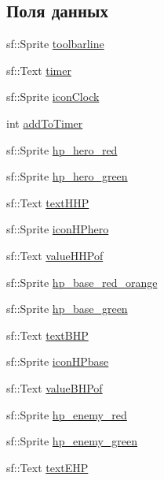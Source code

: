 \subsection*{Поля данных}
\begin{DoxyCompactItemize}
\item 
sf\+::\+Sprite \hyperlink{classToolBar_a32ef55bee6542ce2f9856b1252a5bc00}{toolbarline}
\item 
sf\+::\+Text \hyperlink{classToolBar_a5e34d6e961f9f8d200f11d5c90d10121}{timer}
\item 
sf\+::\+Sprite \hyperlink{classToolBar_a282b572766a7fb833266997f6776aa76}{icon\+Clock}
\item 
int \hyperlink{classToolBar_aa4978a990d85761cb5ab6d60ab5b081c}{add\+To\+Timer}
\item 
sf\+::\+Sprite \hyperlink{classToolBar_a188e889517db774fa50f3babdcc61054}{hp\+\_\+hero\+\_\+red}
\item 
sf\+::\+Sprite \hyperlink{classToolBar_a65b3cfcbb54e656f98639620717bc701}{hp\+\_\+hero\+\_\+green}
\item 
sf\+::\+Text \hyperlink{classToolBar_abb14f5c369cee727893e9eae44594e26}{text\+H\+HP}
\item 
sf\+::\+Sprite \hyperlink{classToolBar_a3a23db17ec632acd38594ba68d5d0584}{icon\+H\+Phero}
\item 
sf\+::\+Text \hyperlink{classToolBar_a30d2ccc2f04f7143b8df59947578b97d}{value\+H\+H\+Pof}
\item 
sf\+::\+Sprite \hyperlink{classToolBar_afb75ac14df5e61b9c50c93beda809415}{hp\+\_\+base\+\_\+red\+\_\+orange}
\item 
sf\+::\+Sprite \hyperlink{classToolBar_a72b41dd993c27b3cb5de4e8d3e7b1c54}{hp\+\_\+base\+\_\+green}
\item 
sf\+::\+Text \hyperlink{classToolBar_a471626dfedf4ed4efda3773701d55364}{text\+B\+HP}
\item 
sf\+::\+Sprite \hyperlink{classToolBar_a29febf7bc604146e8d0df1b041dc13c8}{icon\+H\+Pbase}
\item 
sf\+::\+Text \hyperlink{classToolBar_ae97f03f2157daabe56dd60b56b698e15}{value\+B\+H\+Pof}
\item 
sf\+::\+Sprite \hyperlink{classToolBar_adf6487dd1c7f42354e93702f45eefba6}{hp\+\_\+enemy\+\_\+red}
\item 
sf\+::\+Sprite \hyperlink{classToolBar_a63b820836b22bac6096fc2d947dc0227}{hp\+\_\+enemy\+\_\+green}
\item 
sf\+::\+Text \hyperlink{classToolBar_a9510aea21130fa29c71233c9acc0fcae}{text\+E\+HP}

\end{DoxyCompactItemize}
